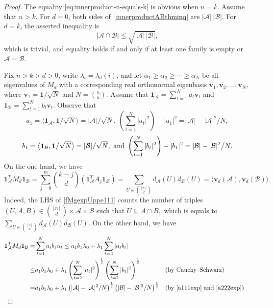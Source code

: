 \documentclass[11pt]{article}
\numberwithin{equation}{section}
\def\A{\mathcal{A}}
\def\B{\mathcal{B}}
\def\v{\mathbf{v}}
\def\1{\mathbf{1}}
\begin{document}
\begin{proof}
The equality \eqref{eq:innerproduct-n-equals-k} is obvious when $n=k$.
Assume that $n>k$.
For $d=0$, both sides of~\eqref{innerproductABthminq} are
$|\mathcal{A}|\,|\mathcal{B}|$.
For $d=k$, the asserted inequality is
\[
|\mathcal{A}\cap\mathcal{B}|
\leq \sqrt{|\mathcal{A}|\,|\mathcal{B}|},
\]
which is trivial, and equality
holds if and only if at least one family is empty or
$\mathcal{A}=\mathcal{B}$.


Fix $n>k>d>0$, write $\lambda_i=\lambda _d(i)$,
and let $\alpha_1\geq \alpha_2\geq \cdots \geq \alpha_N$ be all eigenvalues of $M_d$ with a corresponding real orthonormal eigenbasis
$\v_1,\v_2, \ldots ,\v_N$, where $\v_1=\1\big/\sqrt{N}$ and $N=\binom{n}{k}$.
Assume that $\1_\A=\sum_{t=1}^Na_t \v_t$
and $\1_\B=\sum_{t=1}^Nb_t \v_t$.
Observe that
\begin{equation}\label{a111exp}
a_1=\big\langle \1_\A,\1\big/\sqrt{N}\big\rangle=|\A| \big/\sqrt{N},
~ \left(\sum_{t=1}^N |a_t|^2\right)-|a_1|^2=|\A|-|\A|^2\big/ N,
\end{equation}
\begin{equation}\label{a222exp}
b_1=\big\langle \1_\B,\1\big/\sqrt{N}\big\rangle=|\B| \big/\sqrt{N},
~{\rm and~} \left(\sum_{t=1}^N |b_t|^2\right)-|b_1|^2=|\B|-|\B|^2\big/ N.
\end{equation}
On the one hand, we have
\begin{equation}\label{fMgexpUppe111}
\1_\A^TM_d \1_\B
=\sum_{j=0}^m \binom{k-j}{d} \left(\1_\A^TA_j\1_\B\right)
=\sum_{U\in \binom{[n]}{d}}
d_{\A}(U) d_{\B}(U)
=\big\langle \mathbf{v}_d(\A),\mathbf{v}_d(\B)\big\rangle.
\end{equation}
Indeed, the LHS of \eqref{fMgexpUppe111} counts the number of triples $(U,A,B)\in \binom {[n]}{d}\times \A \times \B$ such that $U\subseteq A\cap B,$ which is equals to
$\sum_{U\in \binom {[n]}{d}}
d_{\A}(U) d_{\B}(U)$.
On the other hand, we have
\begin{align}\label{ABcrossinq111}
\1_\A^TM_d \1_\B
=& \sum_{t=1}^N a_t b_t \alpha_t
\leq a_1 b_1 \lambda _0 + \lambda _1 \sum_{t=2}^N |a_t b_t |\\ \label{ABcrossinq222}
\leq & a_1 b_1\lambda _0 + \lambda _1
\left(\sum_{t=2}^N |a_t|^2\right)^{\frac{1}{2}}
\left(\sum_{t=2}^N |b_t|^2\right)^{\frac{1}{2}}
&& \text {(by Cauchy--Schwarz)}\\ \nonumber
=& a_1 b_1 \lambda _0 + \lambda _1\left(|\A|-|\A|^2/ N \right)^{\frac{1}{2}}
\left(|\B|-|\B|^2/ N \right)^{\frac{1}{2}}
&& \text {(by  \eqref{a111exp} and \eqref{a222exp})}\\\label{ABcrossinq333}

\end{align}
\end{proof}
\end{document}
